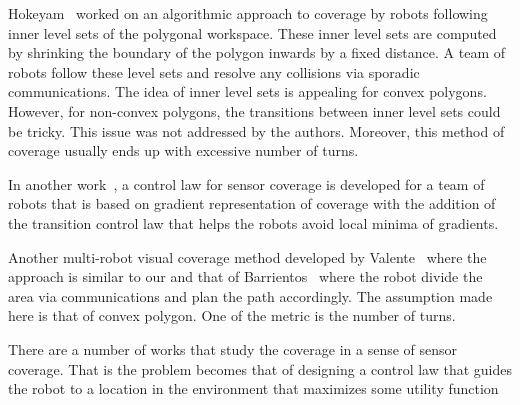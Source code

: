 \documentclass[../main.tex]{subfiles}
\begin{document}

Hokeyam~\cite{hokayem2007dynamic} worked on an algorithmic approach to coverage by robots following inner level sets of the polygonal workspace. These inner level sets are computed by shrinking the boundary of the polygon inwards by a fixed distance. A team of robots follow these level sets and resolve any collisions via sporadic communications. The idea of inner level sets is appealing for convex polygons. However, for non-convex polygons, the transitions between inner level sets could be tricky. This issue was not addressed by the authors. Moreover, this method of coverage usually ends up with excessive number of turns.

In another work~\cite{atincc2013supervised}, a control law for sensor coverage is developed for a team of robots that is based on gradient representation of coverage with the addition of the transition control law that helps the robots avoid local minima of gradients.

Another multi-robot visual coverage method developed by Valente~\cite{valente2011multi} where the approach is similar to our and that of Barrientos~\cite{barrientos2011aerial} where the robot divide the area via communications and plan the path accordingly. The assumption made here is that of convex polygon. One of the metric is the number of turns.

There are a number of works that study the coverage in a sense of sensor coverage. That is the problem becomes that of designing a control law that guides the robot to a location in the environment that maximizes some utility function
\end{document}
